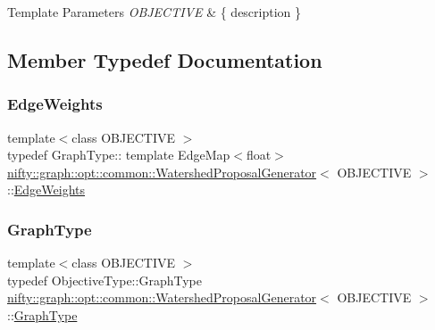 \begin{DoxyTemplParams}{Template Parameters}
{\em O\+B\+J\+E\+C\+T\+I\+VE} & \{ description \} \\
\hline
\end{DoxyTemplParams}


\subsection{Member Typedef Documentation}
\mbox{\label{classnifty_1_1graph_1_1opt_1_1common_1_1WatershedProposalGenerator_a0eab02b7bfa3b93e48b75e3335e18a5a}} 
\subsubsection{\texorpdfstring{Edge\+Weights}{EdgeWeights}}
{\footnotesize\ttfamily template$<$class O\+B\+J\+E\+C\+T\+I\+VE $>$ \\
typedef Graph\+Type\+:: template Edge\+Map$<$float$>$ \hyperlink{classnifty_1_1graph_1_1opt_1_1common_1_1WatershedProposalGenerator}{nifty\+::graph\+::opt\+::common\+::\+Watershed\+Proposal\+Generator}$<$ O\+B\+J\+E\+C\+T\+I\+VE $>$\+::\hyperlink{classnifty_1_1graph_1_1opt_1_1common_1_1WatershedProposalGenerator_a0eab02b7bfa3b93e48b75e3335e18a5a}{Edge\+Weights}}

\mbox{\label{classnifty_1_1graph_1_1opt_1_1common_1_1WatershedProposalGenerator_a376349d1d4bc53280b7ad79f3193ed37}} 
\subsubsection{\texorpdfstring{Graph\+Type}{GraphType}}
{\footnotesize\ttfamily template$<$class O\+B\+J\+E\+C\+T\+I\+VE $>$ \\
typedef Objective\+Type\+::\+Graph\+Type \hyperlink{classnifty_1_1graph_1_1opt_1_1common_1_1WatershedProposalGenerator}{nifty\+::graph\+::opt\+::common\+::\+Watershed\+Proposal\+Generator}$<$ O\+B\+J\+E\+C\+T\+I\+VE $>$\+::\hyperlink{classnifty_1_1graph_1_1opt_1_1common_1_1WatershedProposalGenerator_a376349d1d4bc53280b7ad79f3193ed37}{Graph\+Type}}

